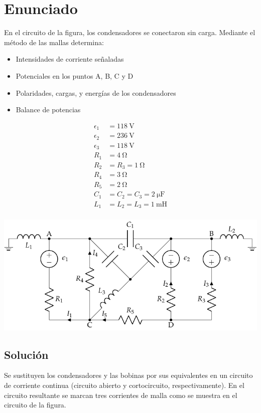 \section{Enunciado}
En el circuito de la figura, los condensadores se conectaron sin
carga. Mediante el método de las mallas determina:
\begin{itemize}
\item Intensidades de corriente señaladas
\item Potenciales en los puntos A, B, C y D
\item Polaridades, cargas, y energías de los condensadores
\item Balance de potencias
\end{itemize}
\begin{minipage}[c]{0.3\linewidth}
  \begin{align*}
    \epsilon_{1}&=\qty{118}{\volt}\\
    \epsilon_{2}&=\qty{236}{\volt}\\
    \epsilon_{3}&=\qty{118}{\volt}\\
    R_{1}&= \qty{4}{\ohm}\\
    R_{2}&=R_{3}=\qty{1}{\ohm}\\
    R_{4}&= \qty{3}{\ohm}\\
    R_{5}&= \qty{2}{\ohm}\\
    C_{1}&=C_{2}=C_{3}=\qty{2}{\micro\farad}\\
    L_1 &= L_2 = L_3 = \qty{1}{\milli\henry}\\
  \end{align*}
\end{minipage}
\begin{minipage}[c]{0.7\linewidth}
  \includegraphics{figuras/mallas_condensadores.pdf}
\end{minipage}

\subsection*{Solución}
Se sustituyen los condensadores y las bobinas por sus equivalentes en
un circuito de corriente continua (circuito abierto y cortocircuito,
respectivamente). En el circuito resultante se marcan tres corrientes
de malla como se muestra en el circuito de la figura.

